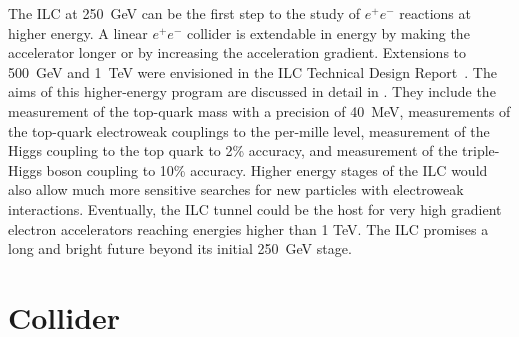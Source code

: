 \documentclass[%
 reprint,
 amsmath,amssymb,
 aps,
]{revtex4-1}
\newcommand{\todo}[1]{\textcolor{red}{{#1}}}
\def\ee{e^+e^-}
\begin{document}
The ILC at 250~GeV can be the first step to the study of $\ee$
reactions at higher energy.   A linear $\ee$ collider is extendable in
energy by making the accelerator longer or by increasing the
acceleration gradient. Extensions to 500~GeV and 1~TeV were envisioned
in the ILC Technical Design Report~\cite{Behnke:2013xla}.   The aims
of 
this higher-energy program are discussed in detail in
\cite{ILCforESS}.
They include the
measurement of the top-quark mass with a precision of 40~MeV, 
measurements of the top-quark
electroweak couplings to the per-mille level, measurement of the
Higgs coupling to the top quark to 2\% accuracy, and measurement of
the triple-Higgs boson coupling to 10\%  accuracy. Higher energy
stages of the ILC  would also allow 
much more sensitive searches for new particles with electroweak interactions.
Eventually, the ILC tunnel could be the host for  very high
gradient electron accelerators reaching energies higher than 1 TeV.   The 
ILC promises a long and bright future beyond its initial 250~GeV stage.



\vspace{-.4cm}

\section{\label{sec:collider}Collider}

\vspace{-.3cm}

\end{document}
